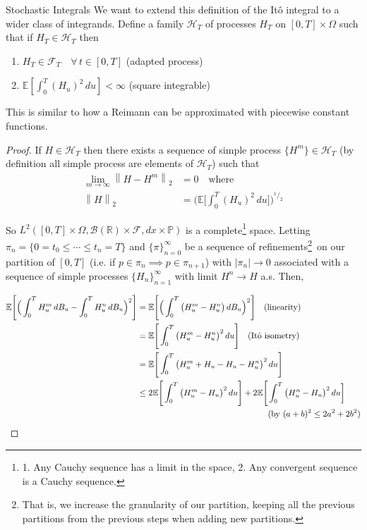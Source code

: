 \documentclass[12pt]{article}
\newenvironment{theorem}[2][Theorem:]{\begin{trivlist} %
\item[\hskip \labelsep {\bfseries #1}\hskip \labelsep {\bfseries #2.}]}{\end{trivlist}}
\newcommand\norm[1]{\left\lVert#1\right\rVert} %
\newlength\tindent
\renewcommand{\indent}{\hspace*{\tindent}}
\begin{document}
\begin{section}{Stochastic Integrals}
\indent We want to extend this definition of the It\^{o} integral to a wider class of integrands. Define a family $\mathcal H_T$ of processes $H_T$ on $[0,T]\times\Omega$ such that if $H_T \in \mathcal H_T$ then
\begin{enumerate}
	\item $H_T \in \mathcal F_T \quad \forall\,t\in[0,T]$ \quad (adapted process)
	\item $\mathbb E[\int^T_0 (H_u)^2\,du] < \infty$ \quad (square integrable)
\end{enumerate}

\begin{theorem}{We may approximate $H_T$ by a family of simple processes} This is similar to how a Reimann can be approximated with piecewise constant functions. 

\begin{proof} If $H \in \mathcal H_T$ then there exists a sequence of simple process $\{H^m\} \in \mathcal H_T$ (by definition all simple process are elements of $\mathcal H_T$) such that
\begin{align*}
	\lim_{m\to\infty} \norm{H - H^m}_2 &= 0 \quad \text{where} \\
	\norm{H}_2 &= \Bigg(\mathbb E\Big[\int^T_0(H_u)^2\,du\Big]\Bigg)^{^1/_2}
\end{align*}

\indent So $L^2([0,T]\times\Omega,\mathcal B(\mathbb R)\times\mathcal F, dx\times\mathbb P)$ is a complete\footnote{1. Any Cauchy sequence has a limit in the space, 2. Any convergent sequence is a Cauchy sequence.} space. Letting $\pi_n = \{0 = t_0 \leq \cdots \leq t_n = T\}$ and $\{\pi\}^\infty_{n = 0}$ be a sequence of refinements\footnote{That is, we increase the granularity of our partition, keeping all the previous partitions from the previous steps when adding new partitions.}~on our partition of $[0,T]$ (i.e. if $p \in \pi_n \implies p \in \pi_{n+1}$) with $|\pi_n| \longrightarrow 0$ associated with a sequence of simple processes $\{H_n\}^\infty_{n = 1}$ with limit $H^n \longrightarrow H$ a.s. Then,

\begin{align*}
	\mathbb E\Bigg[\Big(\int^T_0 H^m_u\,dB_u - \int^T_0 H^n_u\,dB_u\Big)^2\Bigg] &= \mathbb E\Bigg[\Big(\int^T_0 \big(H^m_u - H^n_u\big) \,dB_u\Big)^2\Bigg] \quad \text{(linearity)} \\
	&= \mathbb E\Bigg[\int^T_0 \big(H^m_u - H^n_u\big)^2\,du\Bigg] \quad \text{(It\^{o} isometry)} \\
	&= \mathbb E\Bigg[\int^T_0 \big(H^m_u + H_u - H_u - H^n_u\big)^2\,du\Bigg]  \\
	&\leq 2\mathbb E\Bigg[\int^T_0 \big(H^m_u - H_u\big)^2\,du\Bigg] + 2\mathbb E\Bigg[\int^T_0 \big(H^n_u - H_u \big)^2\,du\bigg] \\
	& \hphantom{{}={2\mathbb E\Bigg[\int^T_0 \big(H^m_u - H_u\big)^2\,du\Bigg]} + 2\mathbb E\Bigg[}  \text{(by $(a+b)^2 \leq 2a^2 + 2b^2$)} \\
\end{align*}


\end{proof}
\end{theorem}
\end{section}
\end{document}
